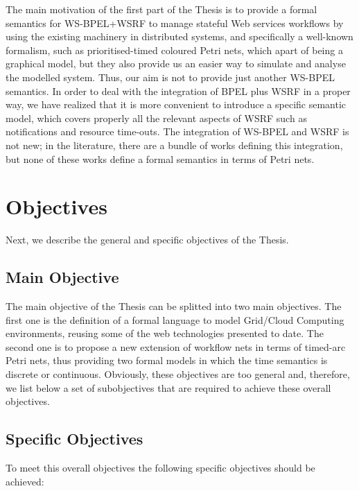 The main motivation of the first part of the Thesis is to provide a formal 
semantics for WS-BPEL+WSRF to manage stateful Web services workflows 
by using the existing machinery in distributed systems,
and specifically a well-known formalism, such as prioritised-timed
coloured Petri nets, which apart of being a graphical model, but they also
provide us an easier way to simulate and analyse the modelled
system. Thus, our aim is not to provide just another WS-BPEL semantics. 
In order to deal with the integration of BPEL plus WSRF in a proper way, 
we have realized that it is more convenient 
to introduce a specific semantic model, which  covers 
properly all the relevant aspects of WSRF such as notifications and 
resource time-outs. 
The integration of WS-BPEL and WSRF is not new; in the literature, 
there are a bundle of works defining this integration, but 
none of these works define a formal semantics in terms of Petri
nets.

\section{Objectives}\label{objectives}

Next, we describe the general and specific objectives of the Thesis.

\subsection*{Main Objective}

The main objective of the Thesis can be splitted into two main objectives. 
The first one is the definition of a formal language to model Grid/Cloud Computing environments, 
reusing some of the web technologies presented to date. 
The second one is to propose a new extension of workflow nets in terms 
of timed-arc Petri nets, thus providing two formal models in which the time semantics is discrete or continuous. 
Obviously, these objectives are too general and, therefore, we list below a set of subobjectives that are
required to achieve these overall objectives.


\subsection*{Specific Objectives}

To meet this overall objectives the following specific objectives should be achieved:

